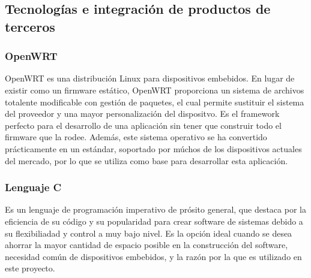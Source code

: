 \documentclass[12pt, twoside]{article}
\begin{document}
    \subsection{Tecnologías e integración de productos de terceros}
        \subsubsection{OpenWRT}
            OpenWRT es una distribución Linux para dispositivos embebidos. En lugar de existir como un firmware estático, OpenWRT proporciona un sistema de archivos totalente modificable con gestión de paquetes, el cual permite sustituir el sistema del proveedor y una mayor personalización del dispositvo. Es el framework perfecto para el desarrollo de una aplicación sin tener que construir todo el firmware que la rodee. Además, este sistema operativo se ha convertido prácticamente en un estándar, soportado por múchos de los dispositivos actuales del mercado, por lo que se utiliza como base para desarrollar esta aplicación.

        \subsubsection{Lenguaje C}
            Es un lenguaje de programación imperativo de prósito general, que destaca por la eficiencia de su código y su popularidad para crear software de sistemas debido a su flexibiliadad y control a muy bajo nivel. Es la opción ideal cuando se desea ahorrar la mayor cantidad de espacio posible en la construcción del software, necesidad común de dispositivos embebidos, y la razón por la que es utilizado en este proyecto.
\end{document}
